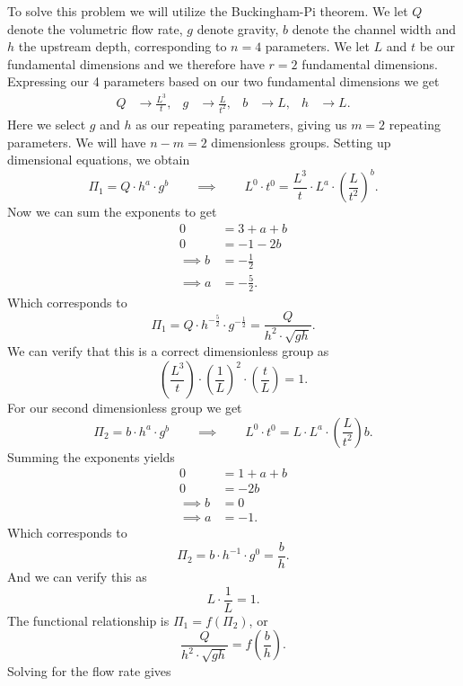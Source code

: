 \begin{derivation}
  To solve this problem we will utilize the Buckingham-Pi theorem.
  We let $Q$ denote the volumetric flow rate, $g$ denote gravity, $b$ denote the channel width and $h$ the upstream depth, corresponding to $n = 4$ parameters.
  We let $L$ and $t$ be our fundamental dimensions and we therefore have $r = 2$ fundamental dimensions.
  Expressing our 4 parameters based on our two fundamental dimensions we get
  \begin{align*}
    Q &\to \frac{L^3}{t}, & g &\to \frac{L}{t^2}, & b &\to L, & h &\to L
  .\end{align*}
  Here we select $g$ and $h$ as our repeating parameters, giving us $m = 2$ repeating parameters.
  We will have $n - m = 2$ dimensionless groups.
  Setting up dimensional equations, we obtain
  \[ 
  \Pi_1 = Q \cdot h^{a} \cdot g^{b} \qquad \implies \qquad L^{0} \cdot t^{0} = \frac{L^3}{t} \cdot L^{a} \cdot \left( \frac{L}{t^2} \right)^{b}
  .\]
  Now we can sum the exponents to get
  \begin{align*}
    0 &= 3 + a + b \\
    0 &= -1 - 2b \\
    \implies b &= - \frac{1}{2} \\
    \implies a &= - \frac{5}{2}
  .\end{align*}
  Which corresponds to
  \[ 
  \Pi_1 = Q \cdot h^{-\frac{5}{2}} \cdot g^{-\frac{1}{2}} = \frac{Q}{h^2 \cdot \sqrt{gh}} 
  .\]
  We can verify that this is a correct dimensionless group as
  \[ 
  \left( \frac{L^3}{t} \right) \cdot \left( \frac{1}{L} \right)^2 \cdot \left( \frac{t}{L} \right) = 1
  .\]
  For our second dimensionless group we get
  \[ 
  \Pi_2 = b \cdot h^{a} \cdot g^{b} \qquad \implies \qquad L^{0} \cdot t^{0} = L \cdot L^{a} \cdot \left( \frac{L}{t^2} \right)b
  .\]
  Summing the exponents yields
  \begin{align*}
    0 &= 1 + a + b \\
    0 &= -2b \\
    \implies b &= 0 \\
    \implies a &= -1
  .\end{align*}
  Which corresponds to
  \[ 
  \Pi_2 = b \cdot h^{-1} \cdot g^{0} = \frac{b}{h}
  .\]
  And we can verify this as
  \[ 
  L \cdot \frac{1}{L} = 1
  .\]
  The functional relationship is $\Pi_1 = f(\Pi_2)$, or
  \[ 
    \frac{Q}{h^2 \cdot \sqrt{gh}} = f \left( \frac{b}{h} \right)
  .\]
  Solving for the flow rate gives
\end{derivation}

